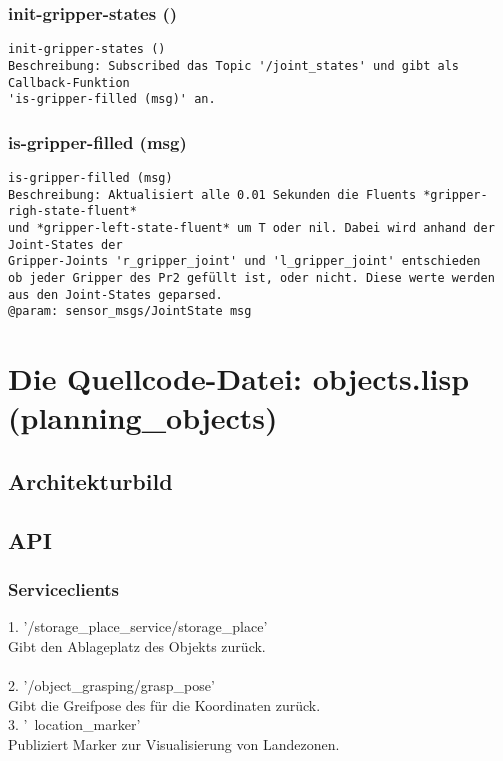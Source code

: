 \documentclass{suturo}
\begin{document}
\subsubsection{init-gripper-states ()}
\begin{verbatim}
init-gripper-states ()
Beschreibung: Subscribed das Topic '/joint_states' und gibt als Callback-Funktion
'is-gripper-filled (msg)' an.
\end{verbatim}

\subsubsection{is-gripper-filled (msg)}
\begin{verbatim}
is-gripper-filled (msg)
Beschreibung: Aktualisiert alle 0.01 Sekunden die Fluents *gripper-righ-state-fluent* 
und *gripper-left-state-fluent* um T oder nil. Dabei wird anhand der Joint-States der
Gripper-Joints 'r_gripper_joint' und 'l_gripper_joint' entschieden
ob jeder Gripper des Pr2 gefüllt ist, oder nicht. Diese werte werden
aus den Joint-States geparsed.
@param: sensor_msgs/JointState msg 
\end{verbatim}



\section{Die Quellcode-Datei: objects.lisp (planning\_objects)}
\subsection{Architekturbild}



\begin{figure}[!htb]
\end{figure}


\subsection{API}
\subsubsection{Serviceclients}
1. '/storage\_place\_service/storage\_place' \\
Gibt den Ablageplatz des Objekts zur\"uck.\\ \\
2. '/object\_grasping/grasp\_pose' \\
Gibt die Greifpose des für die Koordinaten zurück.\\
3. '~location\_marker' \\
Publiziert Marker zur Visualisierung von Landezonen.
\end{document}
